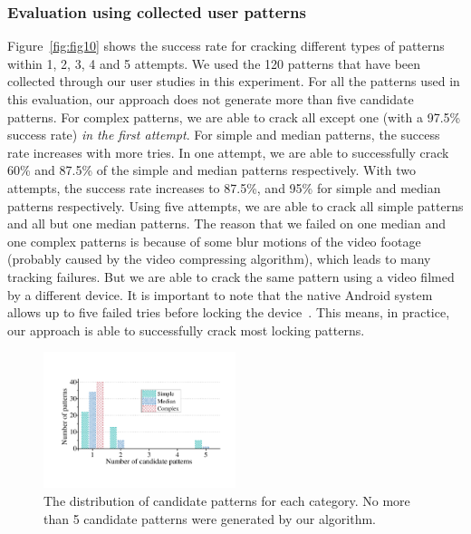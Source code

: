         \subsubsection{Evaluation using collected user patterns}
        Figure~\ref{fig:fig10}
        shows the success rate for cracking different types of patterns within 1, 2, 3, 4 and 5 attempts.
        We used the 120 patterns that have been collected through our user studies in this experiment.
        For all the patterns used in this evaluation,
        our approach does not generate more than  five candidate patterns.
        For complex patterns, we are able to crack all except one (with a 97.5\% success rate) \emph{in the first attempt}.
        For simple and median patterns, the success rate increases with more tries.
        In one attempt, we are able to
        successfully crack 60\% and 87.5\% of the simple and median patterns respectively. With two attempts, the success rate increases to 87.5\%,
        and 95\% for simple and median patterns
        respectively. Using five attempts, we are able to
        crack all simple patterns and all but one median patterns.
       The reason that we failed on one median and one complex patterns is because of some blur motions of the video footage (probably
       caused by the video compressing algorithm), which leads
       to many tracking failures. But we are able to crack the same
       pattern using a video filmed by a different device.
        It is important to note that the native Android system allows up to five failed tries before locking the device~\cite{egelman2014you}. This means, in practice, our approach is able to
        successfully crack most locking patterns.

\begin{figure}[!t]
    \centering
    \includegraphics[width=0.5\textwidth]{fig/11.pdf}
    \caption{The distribution of candidate patterns for each category. No more than 5 candidate patterns were generated by our algorithm. }
    \label{fig:fig11}
\end{figure}

